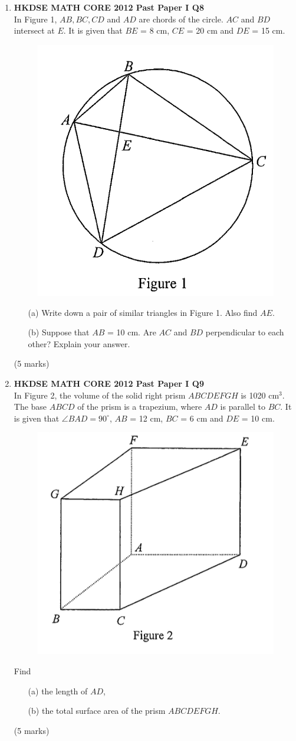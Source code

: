 \documentclass[12pt]{article}
\begin{document}
\begin{enumerate}
	\item \textbf{HKDSE MATH CORE 2012 Past Paper I Q8}\\
	In Figure 1, $AB, BC, CD$ and $AD$ are chords of the circle. $AC$ and $BD$ intersect at $E$. It is given that $BE$ = 8 cm, $CE$ = 20 cm and $DE$ = 15 cm.
	\begin{figure}[H]
		\centering
		\includegraphics[width = .3
		\linewidth]{2012Figure1.1}
	\end{figure}
	\begin{enumerate}
		\item[(a)]Write down a pair of similar triangles in Figure 1. Also find $AE$.
		\item[(b)] Suppose that $AB$ = 10 cm. Are $AC$ and $BD$ perpendicular to each other? Explain your answer.
	\end{enumerate}
	(5 marks)


	\item \textbf{HKDSE MATH CORE 2012 Past Paper I Q9}\\
	In Figure 2, the volume of the solid right prism $ABCDEFGH$ is 1020 cm$^{3}$. The base $ABCD$ of the prism is a trapezium, where $AD$ is parallel to $BC$. It is given that $\angle BAD = 90^{\circ} $, $AB$ = 12 cm, $BC$ = 6 cm and $DE$ = 10 cm.
 
	\begin{figure}[H]
		\centering
		\includegraphics[width = .3\linewidth]{2012Figure1.2}
	\end{figure}
	Find
	\begin{enumerate}
		\item[(a)] the length of $AD$,
		\item[(b)] the total surface area of the prism $ABCDEFGH$.
	\end{enumerate}
	(5 marks)


\end{enumerate}
\end{document}
